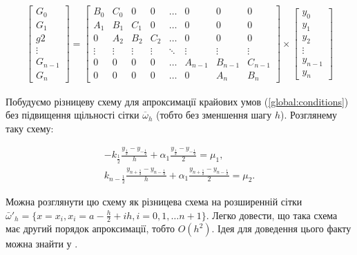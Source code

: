 \begin{align} \label{linear_system}
\left[ \begin{array}{c} G_0 \\ G_1 \\ g2 \\ \vdots \\ G_{n-1} \\ G_n \end{array} \right] = 
\begin{bmatrix} 
B_0 & C_0 & 0 & 0 & \dots & 0 & 0 & 0\\ 
A_1 & B_1 & C_1 & 0 & \dots & 0 & 0 & 0\\ 
0 & A_2 & B_2 & C_2 & \dots & 0 & 0 & 0\\ 
\vdots & \vdots & \vdots & \vdots & \ddots & \vdots & \vdots & \vdots \\
0 & 0 & 0 & 0 & \dots & A_{n-1} & B_{n-1} & C_{n-1} \\
0 & 0 & 0 & 0 & \dots & 0 & A_n & B_n
\end{bmatrix} \times \left[ \begin{array}{c} y_0 \\ y_1 \\ y_2 \\ \vdots \\ y_{n-1} \\ y_n \end{array} \right]
\end{align}

Побудуємо різницеву схему для апроксимації крайових умов (\ref{global:conditions}) без підвищення щільності сітки \(\overline{\omega}_h\) (тобто без зменшення шагу \(h\)). Розглянему таку схему:

\begin{equation}
\begin{multlined} \label{diff:boundary_extended}
-k_{\frac{1}{2}} \frac{y_{\frac{1}{2}} - y_{-\frac{1}{2}}}{h} + \alpha_1 \frac{y_{\frac{1}{2}} - y_{-\frac{1}{2}}}{2} = \mu_1, \\
k_{n - \frac{1}{2}} \frac{y_{n + \frac{1}{2}} - y_{n-\frac{1}{2}}}{h} + \alpha_1 \frac{y_{n+\frac{1}{2}} - y_{n-\frac{1}{2}}}{2} = \mu_2.
\end{multlined}
\end{equation}

Можна розглянути цю схему як різницева схема на розширенній сітки \( \bar{\omega}'_h = \{ x = x_i, x_i = a - \frac{h}{2} + ih, i = 0, 1, \dots n+1\}\). Легко довести, що така схема має другий порядок апроксимації, тобто \( O(h^2)\). Ідея для доведення цього факту можна знайти у \cite[с. 148--149]{Samarskii71}.


